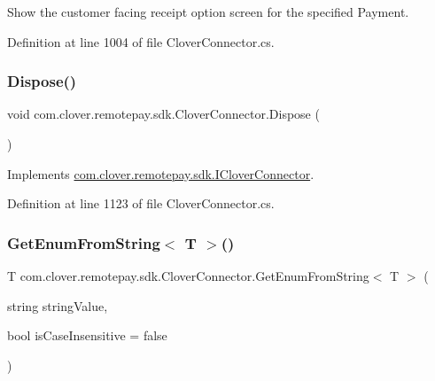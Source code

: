 Show the customer facing receipt option screen for the specified Payment. 



Definition at line 1004 of file Clover\+Connector.\+cs.

\mbox{\label{classcom_1_1clover_1_1remotepay_1_1sdk_1_1_clover_connector_a08a821f3352e90d381bccb650f3078b5}} 
\subsubsection{\texorpdfstring{Dispose()}{Dispose()}}
{\footnotesize\ttfamily void com.\+clover.\+remotepay.\+sdk.\+Clover\+Connector.\+Dispose (\begin{DoxyParamCaption}{ }\end{DoxyParamCaption})}



Implements \hyperlink{interfacecom_1_1clover_1_1remotepay_1_1sdk_1_1_i_clover_connector_a105ca79ce329b1b7427450c323bc1d70}{com.\+clover.\+remotepay.\+sdk.\+I\+Clover\+Connector}.



Definition at line 1123 of file Clover\+Connector.\+cs.

\mbox{\label{classcom_1_1clover_1_1remotepay_1_1sdk_1_1_clover_connector_aa2a0ec7354431592cb9d82e0c93fac45}} 
\subsubsection{\texorpdfstring{Get\+Enum\+From\+String$<$ T $>$()}{GetEnumFromString< T >()}}
{\footnotesize\ttfamily T com.\+clover.\+remotepay.\+sdk.\+Clover\+Connector.\+Get\+Enum\+From\+String$<$ T $>$ (\begin{DoxyParamCaption}\item[{string}]{string\+Value,  }\item[{bool}]{is\+Case\+Insensitive = {\ttfamily false} }\end{DoxyParamCaption})}

